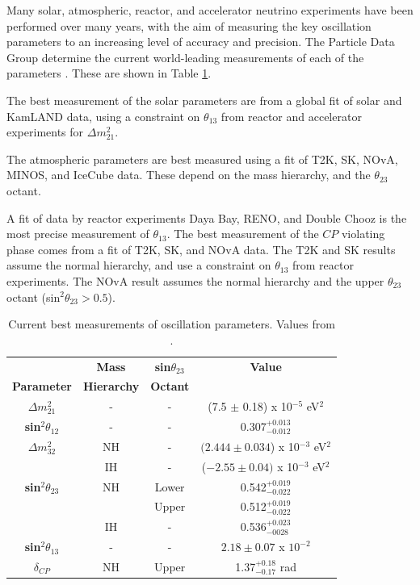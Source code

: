 Many solar, atmospheric, reactor, and accelerator neutrino experiments have been performed over many years, with the aim of measuring the key oscillation parameters to an increasing level of accuracy and precision. The Particle Data Group determine the current world-leading measurements of each of the parameters \cite{pdg}. These are shown in Table \ref{tab:pdg}.

The best measurement of the solar parameters are from a global fit of solar and KamLAND data, using a constraint on $\theta_{13}$ from reactor and accelerator experiments for $\Delta m_{21}^2$. 

The atmospheric parameters are best measured using a fit of T2K, SK, NOvA, MINOS, and IceCube data. These depend on the mass hierarchy, and the $\theta_{23}$ octant.

A fit of data by reactor experiments Daya Bay, RENO, and Double Chooz is the most precise measurement of $\theta_{13}$. The best measurement of the $CP$ violating phase comes from a fit of T2K, SK, and NOvA data. The T2K and SK results assume the normal hierarchy, and use a constraint on $\theta_{13}$ from reactor experiments. The NOvA result assumes the normal hierarchy and the upper $\theta_{23}$ octant (sin$^2 \theta_{23} > 0.5$).

\begin{center}
\begin{table}
\large
\center
\begin{tabular}{ c|c c|| c } 
\hline
\hline
& \textbf{Mass} & \textbf{sin$\theta_{23}$} & \textbf{Value} \\
\textbf{Parameter} & \textbf{Hierarchy} & \textbf{Octant} & \\
\hline
\hline
\textbf{$\Delta m_{21}^2$} & - & - & (7.5 $\pm$ 0.18) x 10$^{-5}$ eV$^2$\\
\textbf{sin$^{2}\theta_{12}$} & - & - & 0.307$^{+0.013}_{-0.012}$ \\
\hline
\textbf{$\Delta m_{32}^2$} & NH & - & $(2.444 \pm 0.034$) x 10$^{-3}$ eV$^2$ \\
 & IH & - & ($-2.55 \pm 0.04)$ x 10$^{-3}$ eV$^2$\\
\textbf{sin$^{2}\theta_{23}$} & NH & Lower & 0.542$^{+0.019}_{-0.022}$\\
 & & Upper & 0.512$^{+0.019}_{-0.022}$ \\
 & IH & - & 0.536$^{+0.023}_{-0028}$\\
\hline
\textbf{sin$^{2}\theta_{13}$} & - & - & $2.18 \pm 0.07$ x $10^{-2}$\\
\textbf{$\delta_{CP}$} & NH & Upper & 1.37$^{+0.18}_{-0.17}$ rad\\
\hline 
\hline
\end{tabular}
\caption{Current best measurements of oscillation parameters. Values from \cite{pdg}.}
\label{tab:pdg}
\end{table}
\end{center}

